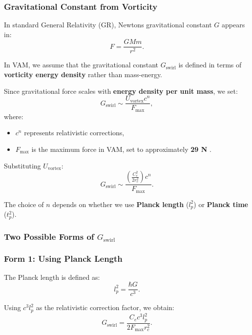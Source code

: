 \subsubsection*{Gravitational Constant from Vorticity}
In standard General Relativity (GR), Newton\rqs s gravitational constant \( G \) appears in:
\begin{equation*}
    F = \frac{GMm}{r^2}.
\end{equation*}

In VAM, we assume that the gravitational constant \(  G_\text{swirl} \) is defined in terms of \textbf{vorticity energy density} rather than mass-energy.

Since gravitational force scales with \textbf{energy density per unit mass}, we set:
\begin{equation*}
     G_\text{swirl} \sim \frac{U_\text{vortex} c^n}{F_{\max}},
\end{equation*}
where:
\begin{itemize}
    \item \( c^n \) represents relativistic corrections,
    \item \( F_{\max} \) is the maximum force in VAM, set to approximately \textbf{29 N} \cite{schiller_max_force}.
\end{itemize}

Substituting \( U_\text{vortex} \):
\begin{equation*}
     G_\text{swirl} \sim \frac{\left( \frac{C_e^2}{2 r_c^2} \right) c^n}{F_{\max}}.
\end{equation*}

The choice of \( n \) depends on whether we use \textbf{Planck length} (\( l_p^2 \)) or \textbf{Planck time} (\( t_p^2 \)).

\subsubsection*{Two Possible Forms of \(  G_\text{swirl} \)}
\subsubsection*{Form 1: Using Planck Length}
The Planck length is defined as:
\begin{equation*}
    l_p^2 = \frac{\hbar G}{c^3}.
\end{equation*}

Using \( c^3 l_p^2 \) as the relativistic correction factor, we obtain:
\begin{equation*}
     G_\text{swirl} = \frac{C_e c^3 l_p^2}{2 F_{\max} r_c^2}.
\end{equation*}

